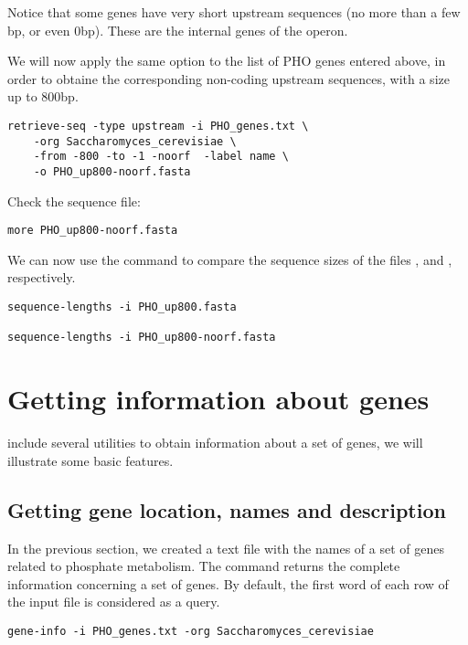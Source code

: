 Notice that some genes have very short upstream sequences (no more
than a few bp, or even 0bp). These are the internal genes of the
 operon. 


We will now apply the same option to the list of PHO genes entered
above, in order to obtaine the corresponding non-coding upstream
sequences, with a size up to 800bp.

\begin{lstlisting}
retrieve-seq -type upstream -i PHO_genes.txt \
    -org Saccharomyces_cerevisiae \
    -from -800 -to -1 -noorf  -label name \
    -o PHO_up800-noorf.fasta
\end{lstlisting}

Check the sequence file:

\begin{lstlisting}
more PHO_up800-noorf.fasta
\end{lstlisting}

We can now use the command  to compare the
sequence sizes of the files , and
, respectively.

\begin{lstlisting}
sequence-lengths -i PHO_up800.fasta

sequence-lengths -i PHO_up800-noorf.fasta
\end{lstlisting}

\section{Getting information about genes}

\RSAT include several utilities to obtain information about a set of
genes, we will illustrate some basic features. 

\subsection{Getting gene location, names and description}

In the previous section, we created a text file with the names of a
set of genes related to phosphate metabolism. The command
 returns the complete information concerning a set
of genes. By default, the first word of each row of the input file is
considered as a query.

\begin{lstlisting}
gene-info -i PHO_genes.txt -org Saccharomyces_cerevisiae
\end{lstlisting}


